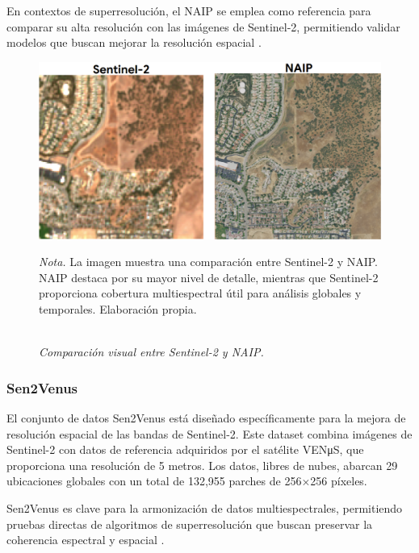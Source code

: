             En contextos de superresolución, el NAIP se emplea como referencia para comparar su alta resolución con las imágenes de Sentinel-2, permitiendo validar modelos que buscan mejorar la resolución espacial \autocite{gargiulo2019fast}.
            
            \begin{figure}[H] 
                \caption{\doublespacing \\ \textit{Comparación visual entre Sentinel-2 y NAIP.}} 
                \centering
                \includegraphics[width=1\linewidth]{images/s2_naip.png}
                \begin{justify}
                    \textit{Nota.} La imagen muestra una comparación entre Sentinel-2 y NAIP. NAIP destaca por su mayor nivel de detalle, mientras que Sentinel-2 proporciona cobertura multiespectral útil para análisis globales y temporales. Elaboración propia.
                \end{justify}                    
                \label{fig:s2_naip}
            \end{figure}

        \subsubsection{Sen2Venus}
        
            El conjunto de datos Sen2Venus está diseñado específicamente para la mejora de resolución espacial de las bandas de Sentinel-2. Este dataset combina imágenes de Sentinel-2 con datos de referencia adquiridos por el satélite VENμS, que proporciona una resolución de 5 metros. Los datos, libres de nubes, abarcan 29 ubicaciones globales con un total de 132,955 parches de 256×256 píxeles.
            
            Sen2Venus es clave para la armonización de datos multiespectrales, permitiendo pruebas directas de algoritmos de superresolución que buscan preservar la coherencia espectral y espacial \autocite{michel2022sen2venmus}.

